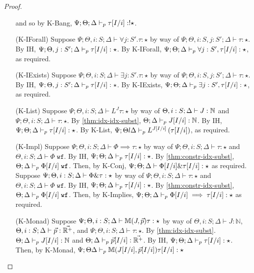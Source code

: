 \begin{proof}
\begin{enumerate}
  and so by K-Bang,
  $\Psi ; \Theta ; \Delta \vdash_p \tau[I/i] : !\star$.
  \item[(K-IForall)] Suppose $\Psi ; \Theta, i : S;  \Delta \vdash \forall j : S'. \tau : \star$ by way of
  $\Psi ; \Theta, i : S, j : S' ; \Delta \vdash \tau : \star$.
  By IH,
  $\Psi ; \Theta, j : S' ; \Delta \vdash_p \tau[I/i] : \star$.
  By K-IForall,
  $\Psi ; \Theta ; \Delta \vdash_p \forall j : S', \tau[I/i] : \star$, as required.
  \item[(K-IExists)] Suppose $\Psi ; \Theta, i : S;  \Delta \vdash \exists j : S'. \tau : \star$ by way of
  $\Psi ; \Theta, i : S, j : S' ; \Delta \vdash \tau : \star$.
  By IH,
  $\Psi ; \Theta, j : S' ; \Delta \vdash_p \tau[I/i] : \star$.
  By K-IExists,
  $\Psi ; \Theta ; \Delta \vdash_p \exists j : S', \tau[I/i] : \star$, as required.
  \item[(K-List)] Suppose $\Psi ; \Theta, i : S ; \Delta \vdash L^J \tau : \star$ by way of
  $\Theta, i : S ; \Delta \vdash J : \mathbb{N}$ and
  $\Psi ; \Theta, i : S ; \Delta \vdash \tau : \star$.
  By \autoref{thm:idx-idx-subst},
  $\Theta ; \Delta \vdash_p J[I/i] : \mathbb{N}$.
  By IH,
  $\Psi ; \Theta ; \Delta \vdash_p \tau[I/i] : \star$.
  By K-List,
  $\Psi ; \Theta l \Delta \vdash_p L^{J[I/i]}\left(\tau[I/i]\right)$,
  as required.
  
  \item[(K-Impl)] Suppose $\Psi ; \Theta, i : S ; \Delta \vdash \Phi \implies \tau : \star$ by way of
  $\Psi ; \Theta, i : S ; \Delta \vdash \tau : \star$ and
  $\Theta, i : S ; \Delta \vdash \Phi \; \texttt{wf}$.
  By IH,
  $\Psi ; \Theta ; \Delta \vdash_p \tau[I/i] : \star$.
  By \autoref{thm:constr-idx-subst},
  $\Theta ; \Delta \vdash_p \Phi[I/i] \; \texttt{wf}$.
  Then, by K-Conj,
  $\Psi ; \Theta ; \Delta \vdash \Phi[I/i] \& \tau[I/i] : \star$
  as required.
  Suppose $\Psi ; \Theta, i : S ; \Delta \vdash \Phi \& \tau : \star$ by way of
  $\Psi ; \Theta, i : S ; \Delta \vdash \tau : \star$ and
  $\Theta, i : S ; \Delta \vdash \Phi \; \texttt{wf}$.
  By IH,
  $\Psi ; \Theta ; \Delta \vdash_p \tau[I/i] : \star$.
  By \autoref{thm:constr-idx-subst},
  $\Theta ; \Delta \vdash_p \Phi[I/i] \; \texttt{wf}$.
  Then, by K-Implies,
  $\Psi ; \Theta ; \Delta \vdash_p \Phi[I/i] \implies \tau[I/i] : \star$
  as required.
  
  \item[(K-Monad)] Suppose
  $\Psi ; \Theta, i : S ; \Delta \vdash \mathbb{M}(J,\vec{p}) \tau : \star$
  by way of
  $\Theta, i : S ; \Delta \vdash J : \mathbb{N}$,
  $\Theta, i : S ; \Delta \vdash \vec{p} : \vec{\mathbb{R}^+}$, and
  $\Psi ; \Theta, i : S ; \Delta \vdash \tau : \star$.
  By \autoref{thm:idx-idx-subst}.
  $\Theta ; \Delta \vdash_p J[I/i] : \mathbb{N}$ and
  $\Theta ; \Delta \vdash_p \vec{p}[I/i] : \vec{\mathbb{R}^+}$.
  By IH,
  $\Psi ; \Theta ; \Delta \vdash_p \tau[I/i] : \star$.
  Then, by K-Monad,
  $\Psi ; \Theta  \Delta \vdash_p \mathbb{M}(J[I/i],\vec{p}[I/i]) \tau[I/i] : \star$
  

\end{enumerate}
\end{proof}
